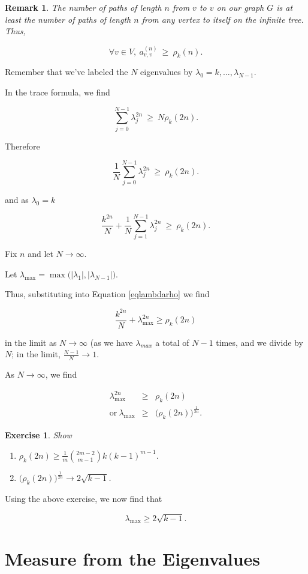 \documentclass[12pt,letterpaper]{report}
\newcommand\be{\begin{equation}}
\newcommand\ee{\end{equation}}
\newcommand\bea{\begin{eqnarray}}
\newcommand\eea{\end{eqnarray}}
\newcommand\ben{\begin{enumerate}}
\newcommand\een{\end{enumerate}}
\newtheorem{exe}[thm]{Exercise}
\newtheorem{rek}[thm]{Remark}
\newcommand{\ncr}[2]{{#1 \choose #2}}
\begin{document}
\begin{rek} The number of paths of length $n$ from $v$ to $v$ on
our graph $G$ is at least the number of paths of length $n$ from
any vertex to itself on the infinite tree. Thus,

\be \forall v \in V, \ a^{(n)}_{v,v} \ \ge \ \rho_k(n). \ee

\end{rek}

Remember that we've labeled the $N$ eigenvalues by $\lambda_0 = k,
\dots, \lambda_{N-1}$.

In the trace formula, we find

\be \sum_{j=0}^{N-1} \lambda_j^{2n} \ \ge \ N \rho_k(2n). \ee

Therefore

\be \frac{1}{N} \sum_{j=0}^{N-1} \lambda_j^{2n} \ \ge \
\rho_k(2n).
 \ee

and as $\lambda_0 = k$

\be\label{eqlambdarho} \frac{k^{2n}}{N} + \frac{1}{N}
\sum_{j=1}^{N-1} \lambda_j^{2n} \ \ge \  \rho_k(2n). \ee

Fix $n$ and let $N \to \infty$.

Let $\lambda_{\max} = \max\Big( |\lambda_1|, |\lambda_{N-1}|
\Big)$.

Thus, substituting into Equation \ref{eqlambdarho} we find

\be \frac{k^{2n}}{N} + \lambda_{\max}^{2n} \ge \rho_k(2n) \ee

in the limit as $N \rightarrow \infty$ (as we have $\lambda_{max}$
a total of $N-1$ times, and we divide by $N$; in the limit,
$\frac{N-1}{N} \to 1$.

As $N \to \infty$, we find

\bea \lambda_{\max}^{2n} & \ge & \rho_k(2n) \nonumber\\ \text{or}
\ \lambda_{\max} & \ge & \Big( \rho_k(2n) \Big)^{\frac{1}{2n}}.
\eea

\begin{exe} Show
\ben
\item $\rho_k(2n) \ge \frac{1}{m} \ncr{2m-2}{m-1} k(k-1)^{m-1}$.
\item $\Big( \rho_k(2n) \Big)^{\frac{1}{2n}} \to 2\sqrt{k-1}$.
\een
\end{exe}

Using the above exercise, we now find that

\be \lambda_{\max} \ge 2\sqrt{k-1}. \ee

\section{Measure from the Eigenvalues}
\end{document}
